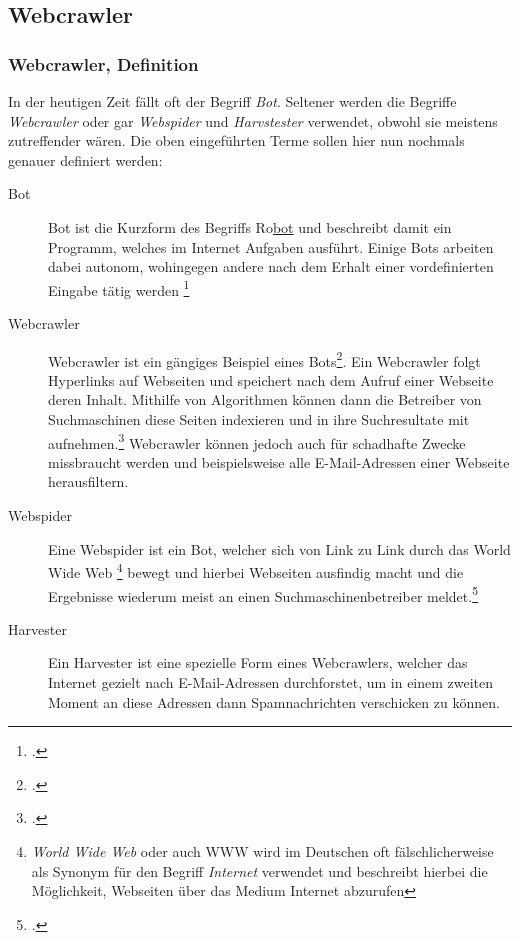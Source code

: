 \subsection{Webcrawler}
\subsubsection{Webcrawler, Definition}
In der heutigen Zeit fällt oft der Begriff \emph{Bot}. Seltener werden die Begriffe \emph{Webcrawler} oder gar \emph{Webspider} und \emph{Harvstester} verwendet, obwohl sie meistens zutreffender wären. Die oben eingeführten Terme sollen hier nun nochmals genauer definiert werden: 
\begin{description}
	\item[Bot] Bot ist die Kurzform des Begriffs Ro\underline{bot} und beschreibt damit ein Programm, welches im Internet Aufgaben ausführt. Einige Bots arbeiten dabei autonom, wohingegen andere nach dem Erhalt einer vordefinierten Eingabe tätig werden \footcite[sinngemäß ins Deutsche übersetzt aus: ][]{def-bot}
	
	\item[Webcrawler] Webcrawler ist ein gängiges Beispiel eines Bots\footcite[sinngemäß ins Deutsche übersetzt aus: ][]{def-bot}. Ein Webcrawler folgt Hyperlinks auf Webseiten und speichert nach dem Aufruf einer Webseite deren Inhalt. Mithilfe von Algorithmen können dann die Betreiber von Suchmaschinen diese Seiten indexieren und in ihre Suchresultate mit aufnehmen.\footcite[sinngemäß ins Deutsche übersetzt aus: ][]{def-bot} Webcrawler können jedoch auch für schadhafte Zwecke missbraucht werden und beispielsweise alle E-Mail-Adressen einer Webseite herausfiltern. 
	
	\item[Webspider] Eine Webspider ist ein Bot, welcher sich von Link zu Link durch das World Wide Web \footnote{\emph{World Wide Web} oder auch WWW wird im Deutschen oft fälschlicherweise als Synonym für den Begriff \emph{Internet} verwendet und beschreibt hierbei die Möglichkeit, Webseiten über das Medium Internet abzurufen} bewegt und hierbei Webseiten ausfindig macht und die Ergebnisse wiederum meist an einen Suchmaschinenbetreiber meldet.\footcite[sinngemäß ins Deutsche übersetzt aus: ][]{def-spider}
	
	\item[Harvester] Ein Harvester ist eine spezielle Form eines Webcrawlers, welcher das Internet gezielt nach E-Mail-Adressen durchforstet, um in einem zweiten Moment an diese Adressen dann Spamnachrichten verschicken zu können.
\end{description}
